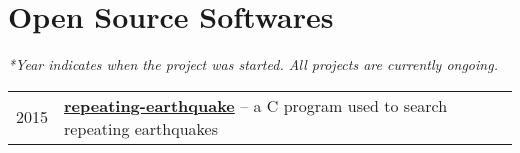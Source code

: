 \section*{Open Source Softwares}

\textit{*Year indicates when the project was started. All projects are currently ongoing.}

\begin{tabular}{p{} p{}}
2015 &	\textbf{\href{https://github.com/core-man/repeating-earthquake/}{repeating-earthquake}} -- a C program used to search repeating earthquakes \\
\end{tabular}
